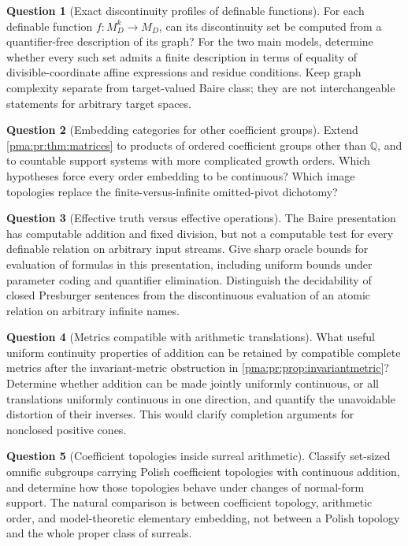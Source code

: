 \documentclass[11pt]{article}
\numberwithin{equation}{section}
\theoremstyle{definition}
\newtheorem{question}[question]{Question}
\theoremstyle{remark}
\newcommand{\Q}{\mathbb Q}
\begin{document}
\begin{question}[Exact discontinuity profiles of definable functions]
For each definable function $f:M_D^k\to M_D$, can its discontinuity set be
computed from a quantifier-free description of its graph? For the two main
models, determine whether every such set admits a finite description in
terms of equality of divisible-coordinate affine expressions and residue
conditions. Keep graph complexity separate from target-valued Baire class;
they are not interchangeable statements for arbitrary target spaces.
\end{question}

\begin{question}[Embedding categories for other coefficient groups]
Extend \cref{pma:pr:thm:matrices} to products of ordered coefficient groups other
than $\Q$, and to countable support systems with more complicated growth
orders. Which hypotheses force every order embedding to be continuous?
Which image topologies replace the finite-versus-infinite omitted-pivot
dichotomy?
\end{question}

\begin{question}[Effective truth versus effective operations]
The Baire presentation has computable addition and fixed division, but not
a computable test for every definable relation on arbitrary input streams.
Give sharp oracle bounds for evaluation of formulas in this presentation,
including uniform bounds under parameter coding and quantifier
elimination. Distinguish the decidability of closed Presburger sentences
from the discontinuous evaluation of an atomic relation on arbitrary
infinite names.
\end{question}

\begin{question}[Metrics compatible with arithmetic translations]
What useful uniform continuity properties of addition can be retained by
compatible complete metrics after the invariant-metric obstruction in
\cref{pma:pr:prop:invariantmetric}? Determine whether addition can be made jointly
uniformly continuous, or all translations uniformly continuous in one
direction, and quantify the unavoidable distortion of their inverses.
This would clarify completion arguments for nonclosed positive cones.
\end{question}

\begin{question}[Coefficient topologies inside surreal arithmetic]
Classify set-sized omnific subgroups carrying Polish coefficient topologies
with continuous addition, and determine how those topologies behave under
changes of normal-form support. The natural comparison is between
coefficient topology, arithmetic order, and model-theoretic elementary
embedding, not between a Polish topology and the whole proper class of
surreals.
\end{question}
\end{document}
